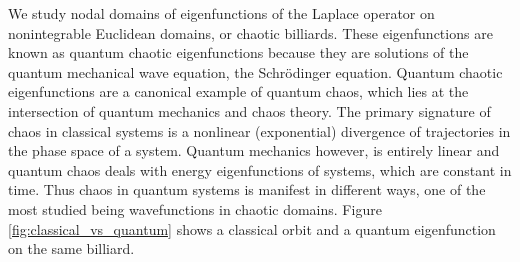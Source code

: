 \documentclass{report}
\begin{document}
We study nodal domains of eigenfunctions of the Laplace operator on nonintegrable Euclidean domains, or chaotic billiards. These eigenfunctions are known as quantum chaotic eigenfunctions because they are solutions of the quantum mechanical wave equation, the Schr\"{o}dinger equation. Quantum chaotic eigenfunctions are a canonical example of quantum chaos, which lies at the intersection of quantum mechanics and chaos theory. The primary signature of chaos in classical systems is a nonlinear (exponential) divergence of trajectories in the phase space of a system. Quantum mechanics however, is entirely linear and quantum chaos deals with energy eigenfunctions of systems, which are constant in time. Thus chaos in quantum systems is manifest in different ways, one of the most studied being wavefunctions in chaotic domains. Figure \ref{fig:classical_vs_quantum} shows a classical orbit and a quantum eigenfunction on the same billiard.
\end{document}
